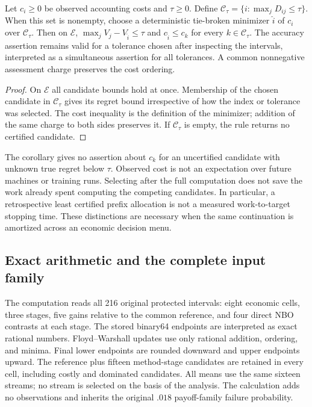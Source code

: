 \begin{corollary}\label{cor:r18selection}
Let $c_i\geq0$ be observed accounting costs and $\tau\geq0$. Define
$\mathcal C_\tau=\{i:\max_jD_{ij}\leq\tau\}$.
When this set is nonempty, choose a deterministic tie-broken minimizer
$\widehat i$ of $c_i$ over $\mathcal C_\tau$.
Then on $\mathcal E$,
$\max_jV_j-V_{\widehat i}\leq\tau$ and
$c_{\widehat i}\leq c_k$ for every $k\in\mathcal C_\tau$.
The accuracy assertion remains valid for a tolerance chosen after inspecting
the intervals, interpreted as a simultaneous assertion for all tolerances.
A common nonnegative assessment charge preserves the cost ordering.
\end{corollary}
\begin{proof}
On $\mathcal E$ all candidate bounds hold at once. Membership of the chosen
candidate in $\mathcal C_\tau$ gives its regret bound irrespective of how
the index or tolerance was selected. The cost inequality is the definition
of the minimizer; addition of the same charge to both sides preserves it.
If $\mathcal C_\tau$ is empty, the rule returns no certified candidate.
\end{proof}

The corollary gives no assertion about $c_k$ for an uncertified candidate
with unknown true regret below $\tau$. Observed cost is not an expectation
over future machines or training runs. Selecting after the full computation
does not save the work already spent computing the competing candidates.
In particular, a retrospective least certified prefix allocation is not a
measured work-to-target stopping time. These distinctions are necessary
when the same continuation is amortized across an economic decision menu.

\subsection{Exact arithmetic and the complete input family}
The computation reads all 216 original protected intervals: eight economic
cells, three stages, five gains relative to the common reference, and four
direct NBO contrasts at each stage. The stored binary64 endpoints are
interpreted as exact rational numbers. Floyd--Warshall updates use only
rational addition, ordering, and minima. Final lower endpoints are rounded
downward and upper endpoints upward. The reference plus fifteen method-stage
candidates are retained in every cell, including costly and dominated
candidates. All means use the same sixteen streams; no stream is selected
on the basis of the analysis. The calculation adds no observations and
inherits the original $.018$ payoff-family failure probability.
